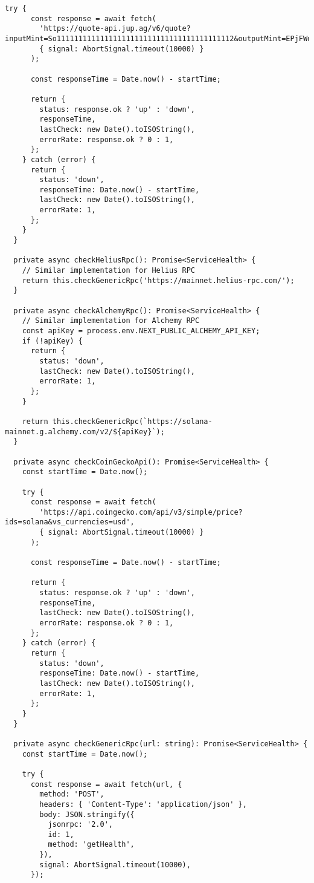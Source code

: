 \documentclass[11pt,a4paper]{article}
\begin{document}
\begin{lstlisting}[style=javascript, caption=Comprehensive Health Monitoring System]
    try {
      const response = await fetch(
        'https://quote-api.jup.ag/v6/quote?inputMint=So11111111111111111111111111111111111111112&outputMint=EPjFWdd5AufqSSqeM2qN1xzybapC8G4wEGGkZwyTDt1v&amount=1000000000',
        { signal: AbortSignal.timeout(10000) }
      );
      
      const responseTime = Date.now() - startTime;
      
      return {
        status: response.ok ? 'up' : 'down',
        responseTime,
        lastCheck: new Date().toISOString(),
        errorRate: response.ok ? 0 : 1,
      };
    } catch (error) {
      return {
        status: 'down',
        responseTime: Date.now() - startTime,
        lastCheck: new Date().toISOString(),
        errorRate: 1,
      };
    }
  }
  
  private async checkHeliusRpc(): Promise<ServiceHealth> {
    // Similar implementation for Helius RPC
    return this.checkGenericRpc('https://mainnet.helius-rpc.com/');
  }
  
  private async checkAlchemyRpc(): Promise<ServiceHealth> {
    // Similar implementation for Alchemy RPC
    const apiKey = process.env.NEXT_PUBLIC_ALCHEMY_API_KEY;
    if (!apiKey) {
      return {
        status: 'down',
        lastCheck: new Date().toISOString(),
        errorRate: 1,
      };
    }
    
    return this.checkGenericRpc(`https://solana-mainnet.g.alchemy.com/v2/${apiKey}`);
  }
  
  private async checkCoinGeckoApi(): Promise<ServiceHealth> {
    const startTime = Date.now();
    
    try {
      const response = await fetch(
        'https://api.coingecko.com/api/v3/simple/price?ids=solana&vs_currencies=usd',
        { signal: AbortSignal.timeout(10000) }
      );
      
      const responseTime = Date.now() - startTime;
      
      return {
        status: response.ok ? 'up' : 'down',
        responseTime,
        lastCheck: new Date().toISOString(),
        errorRate: response.ok ? 0 : 1,
      };
    } catch (error) {
      return {
        status: 'down',
        responseTime: Date.now() - startTime,
        lastCheck: new Date().toISOString(),
        errorRate: 1,
      };
    }
  }
  
  private async checkGenericRpc(url: string): Promise<ServiceHealth> {
    const startTime = Date.now();
    
    try {
      const response = await fetch(url, {
        method: 'POST',
        headers: { 'Content-Type': 'application/json' },
        body: JSON.stringify({
          jsonrpc: '2.0',
          id: 1,
          method: 'getHealth',
        }),
        signal: AbortSignal.timeout(10000),
      });
      

\end{lstlisting}
\end{document}
